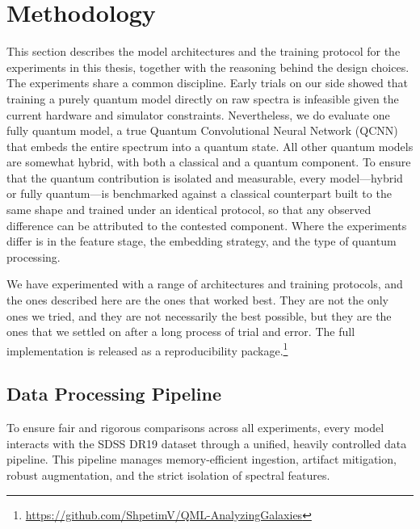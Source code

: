 \FloatBarrier
\section{Methodology}
\label{sec:methodology}

This section describes the model architectures and the training protocol for the
experiments in this thesis, together with the reasoning behind the design choices.
The experiments share a common discipline. Early trials on our side showed that training a purely
quantum model directly on raw spectra is infeasible given the current hardware and
simulator constraints. Nevertheless, we do evaluate one fully quantum model, a true
Quantum Convolutional Neural Network (QCNN) that embeds the entire spectrum into a
quantum state. All other quantum models are somewhat hybrid, with both a classical and a quantum component. To ensure that the quantum contribution is isolated and measurable, every model—hybrid
or fully quantum—is benchmarked against a classical counterpart built to the same
shape and trained under an identical protocol, so that any observed difference can
be attributed to the contested component. Where the experiments differ is in the
feature stage, the embedding strategy, and the type of quantum processing.

We have experimented with a range of architectures and training protocols, and
the ones described here are the ones that worked best. They are not the only ones we
tried, and they are not necessarily the best possible, but they are the ones that
we settled on after a long process of trial and error. The full implementation is
released as a reproducibility package.\footnote{\url{https://github.com/ShpetimV/QML-AnalyzingGalaxies}}

\subsection{Data Processing Pipeline}
\label{sec:data_pipeline}

To ensure fair and rigorous comparisons across all experiments, every model interacts with the SDSS DR19 dataset through a unified, heavily controlled data pipeline. This pipeline manages memory-efficient ingestion, artifact mitigation, robust augmentation, and the strict isolation of spectral features.

